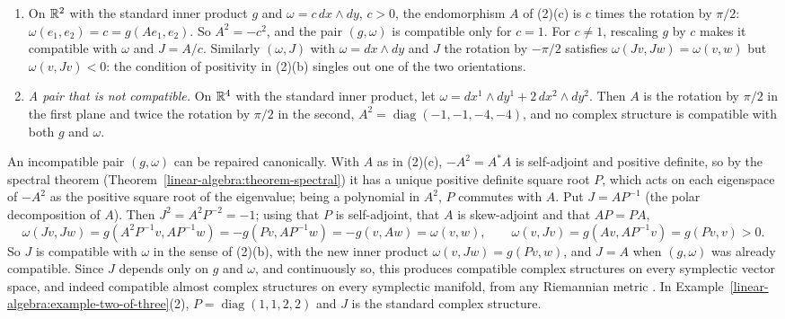 \begin{example}\label{linear-algebra:example-two-of-three}
\begin{enumerate}
\item On $\mathbb{R}^2$ with the standard inner product $g$ and $\omega = c\,dx \wedge dy$, $c > 0$, the endomorphism $A$ of (2)(c) is $c$ times the rotation by $\pi/2$: $\omega(e_1, e_2) = c = g(Ae_1, e_2)$.
So $A^2 = -c^2$, and the pair $(g, \omega)$ is compatible only for $c = 1$. For $c \neq 1$, rescaling $g$ by $c$ makes it compatible with $\omega$ and $J = A/c$. Similarly $(\omega, J)$ with
$\omega = dx \wedge dy$ and $J$ the rotation by $-\pi/2$ satisfies $\omega(Jv, Jw) = \omega(v, w)$ but $\omega(v, Jv) < 0$: the condition of positivity in (2)(b) singles out one of the two orientations.
\item \emph{A pair that is not compatible.} On $\mathbb{R}^4$ with the standard inner product, let $\omega = dx^1 \wedge dy^1 + 2\,dx^2 \wedge dy^2$. Then $A$ is the rotation by $\pi/2$ in the first plane and twice
the rotation by $\pi/2$ in the second, $A^2 = \operatorname{diag}(-1, -1, -4, -4)$, and no complex structure is compatible with both $g$ and $\omega$.
\end{enumerate}
\end{example}

\begin{remark}\label{linear-algebra:remark-polar-compatible}
An incompatible pair $(g, \omega)$ can be repaired canonically. With $A$ as in (2)(c), $-A^2 = A^*A$ is self-adjoint and positive definite, so by the spectral theorem
(Theorem~\ref{linear-algebra:theorem-spectral}) it has a unique positive definite square root $P$, which acts on each eigenspace of $-A^2$ as the positive square root of the eigenvalue; being a
polynomial in $A^2$, $P$ commutes with $A$. Put $J = AP^{-1}$ (the polar decomposition of $A$). Then $J^2 = A^2P^{-2} = -1$; using that $P$ is self-adjoint, that $A$ is skew-adjoint and that $AP = PA$,
\[
\omega(Jv, Jw) = g(A^2P^{-1}v, AP^{-1}w) = -g(Pv, AP^{-1}w) = -g(v, Aw) = \omega(v, w), \qquad \omega(v, Jv) = g(Av, AP^{-1}v) = g(Pv, v) > 0.
\]
So $J$ is compatible with $\omega$ in the sense of (2)(b), with the new inner product $\omega(v, Jw) = g(Pv, w)$, and $J = A$ when $(g, \omega)$ was already compatible. Since $J$ depends only on $g$ and
$\omega$, and continuously so, this produces compatible complex structures on every symplectic vector space, and indeed compatible almost complex structures on every symplectic manifold, from any
Riemannian metric \cite{mcduff-salamon}. In Example~\ref{linear-algebra:example-two-of-three}(2), $P = \operatorname{diag}(1, 1, 2, 2)$ and $J$ is the standard complex structure.
\end{remark}

